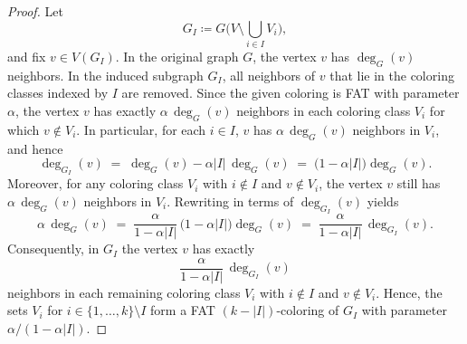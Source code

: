 \documentclass[10pt,a4paper]{amsart}
\begin{document}
\begin{proof}
    Let \[
        G_{I}\coloneqq G\bigl(V\setminus\bigcup_{i\in I}V_i\bigr),
    \] and fix $v\in V(G_I)$.
    In the original graph $G$, the vertex $v$ has $\deg_G(v)$ neighbors. In the induced subgraph $G_I$, all neighbors of $v$ that lie in the coloring classes indexed by $I$ are removed. Since the given coloring is FAT with parameter $\alpha$, the vertex $v$ has exactly $\alpha\,\deg_G(v)$ neighbors in each coloring class $V_i$ for which $v\notin V_i$. In particular, for each $i\in I$, $v$ has $\alpha\,\deg_G(v)$ neighbors in $V_i$, and hence
    \[
        \deg_{G_I}(v)
        \;=\;
        \deg_G(v) - \alpha\lvert I\rvert\,\deg_G(v)
        \;=\;
        \bigl(1-\alpha\lvert I\rvert\bigr)\deg_G(v).
    \]
    Moreover, for any coloring class $V_i$ with $i\notin I$ and $v\notin V_i$, the vertex $v$ still has $\alpha\,\deg_G(v)$ neighbors in $V_i$. Rewriting in terms of $\deg_{G_I}(v)$ yields
    \[
        \alpha\,\deg_G(v)
        \;=\;
        \frac{\alpha}{1-\alpha\lvert I\rvert}\,\bigl(1-\alpha\lvert I\rvert\bigr)\deg_G(v)
        \;=\;
        \frac{\alpha}{1-\alpha\lvert I\rvert}\,\deg_{G_I}(v).
    \]
    Consequently, in $G_I$ the vertex $v$ has exactly
    \[
        \frac{\alpha}{1-\alpha\lvert I\rvert}\,\deg_{G_I}(v)
    \]
    neighbors in each remaining coloring class $V_i$ with $i\notin I$ and $v\notin V_i$. Hence, the sets $V_i$ for $i\in \{1,\ldots,k\}\setminus I$ form a FAT $(k-\lvert I\rvert)$-coloring of $G_I$ with parameter $\alpha/(1-\alpha\lvert I\rvert)$.
\end{proof}
\end{document}
